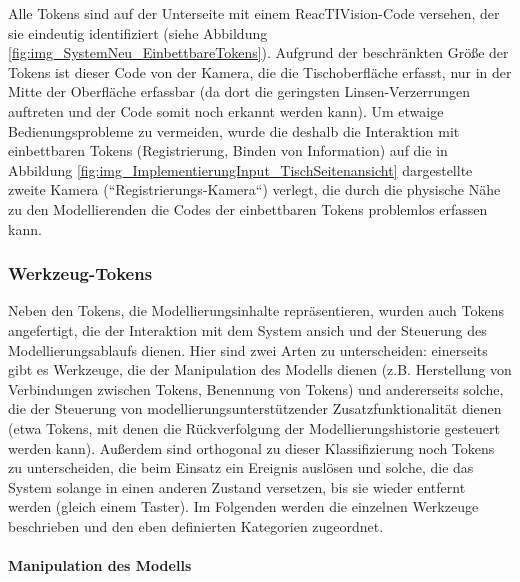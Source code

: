 Alle Tokens sind auf der Unterseite mit einem ReacTIVision-Code versehen, der sie eindeutig identifiziert (siehe Abbildung \ref{fig:img_SystemNeu_EinbettbareTokens}). Aufgrund der beschränkten Größe der Tokens ist dieser Code von der Kamera, die die Tischoberfläche erfasst, nur in der Mitte der Oberfläche erfassbar (da dort die geringsten Linsen-Verzerrungen auftreten und der Code somit noch erkannt werden kann). Um etwaige Bedienungsprobleme zu vermeiden, wurde die deshalb die Interaktion mit einbettbaren Tokens (Registrierung, Binden von Information) auf die in Abbildung \ref{fig:img_ImplementierungInput_TischSeitenansicht} dargestellte zweite Kamera (“Registrierungs-Kamera“) verlegt, die durch die physische Nähe zu den Modellierenden die Codes der einbettbaren Tokens problemlos erfassen kann.


\subsubsection{Werkzeug-Tokens} %
\label{ssub:werkzeug_tokens}

Neben den Tokens, die Modellierungsinhalte repräsentieren, wurden auch Tokens angefertigt, die der Interaktion mit dem System ansich und der Steuerung des Modellierungsablaufs dienen. Hier sind zwei Arten zu unterscheiden: einerseits gibt es Werkzeuge, die der Manipulation des Modells dienen (z.B. Herstellung von Verbindungen zwischen Tokens, Benennung von Tokens) und andererseits solche, die der Steuerung von modellierungsunterstützender Zusatzfunktionalität dienen (etwa Tokens, mit denen die Rückverfolgung der Modellierungshistorie gesteuert werden kann). Außerdem sind orthogonal zu dieser Klassifizierung noch Tokens zu unterscheiden, die beim Einsatz ein Ereignis auslösen und solche, die das System solange in einen anderen Zustand versetzen, bis sie wieder entfernt werden (gleich einem Taster). Im Folgenden werden die einzelnen Werkzeuge beschrieben und den eben definierten Kategorien zugeordnet.

\paragraph{Manipulation des Modells} %
\label{par:manipulation_des_modells}


